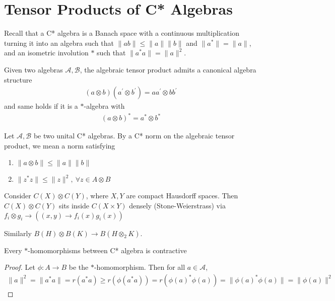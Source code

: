 

\section{Tensor Products of C* Algebras}
\begin{definition}
  Recall that a C* algebra is a Banach space with a continuous
  multiplication turning it into an algebra such that $\|ab\| \le
  \|a\|\|b\|$ and $\|a^*\| = \|a\|$, and an isometric involution $*$
  such that $\|a^*a\| = \|a\|^2$.
\end{definition}

Given two algebras $\mathcal{A, B}$, the algebraic tensor product
admits a canonical algebra structure
\begin{align*}
  (a \otimes b)(a^\prime \otimes b^\prime) = aa^\prime \otimes bb^\prime
\end{align*}
and same holds if it is a $*$-algebra with
\begin{align*}
  (a \otimes b )^* = a^* \otimes b^*
\end{align*}

\begin{definition}
  Let $\mathcal{A, B}$ be two unital C* algebras. By a C* norm on the
  algebraic tensor product, we mean a norm satisfying
  \begin{enumerate}[label=(\arabic*)]
    \item $\|a \otimes b\| \le \|a\|\|b\|$
    \item $\|z^* z\| \le \|z\|^2, \ \forall z \in A \otimes B$
  \end{enumerate}
\end{definition}

\begin{example}
  Consider $C(X) \otimes C(Y)$, where $X, Y$ are compact Hausdorff
  spaces. Then $C(X) \otimes C(Y)$ sits inside $C(X \times Y)$
  densely (Stone-Weierstrass) via
  $f_i \otimes g_i \to ((x, y) \to f_i(x) g_i(x))$
\end{example}

\begin{example}
  Similarly $B(H) \otimes B(K) \to B(H \otimes_2 K)$.
\end{example}

\begin{lemma}
  Every $*$-homomorphisms between C* algebra is contractive
\end{lemma}
\begin{proof}
  Let $\phi: A \to B$ be the $*$-homomorphism. Then for all $ a \in
  \mathcal{A}$,
  \begin{align*}
    \|a\|^2 = \|a^*a\| = r(a^*a) \ge r(\phi(a^*a)) = r(\phi(a)^*
    \phi(a)) = \| \phi(a)^*\phi(a)\| = \|\phi(a)\|^2
  \end{align*}
\end{proof}

